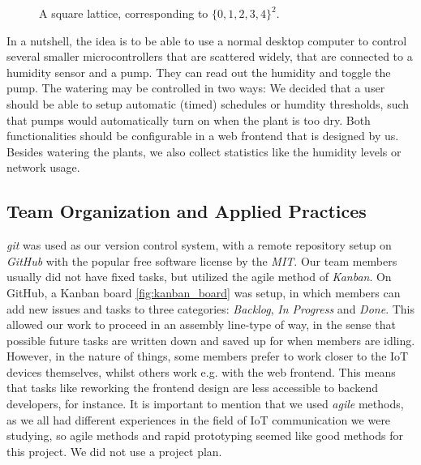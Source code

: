 \documentclass[acmtog, language=english, nonacm]{acmart}
\begin{document}
    \begin{figure}[!hbtp]
        \centering
        \small
        \caption{A square lattice, corresponding to \(\{0, 1, 2, 3, 4\}^2\).}
        \label{fig:lattice}
    \end{figure}

    In a nutshell, the idea is to be able to use a normal desktop computer to control several smaller microcontrollers that are scattered widely, that are connected to a humidity sensor and a pump. They can read out the humidity and toggle the pump. The watering may be controlled in two ways: We decided that a user should be able to setup automatic (timed) schedules or humdity thresholds, such that pumps would automatically turn on when the plant is too dry. Both functionalities should be configurable in a web frontend that is designed by us. Besides watering the plants, we also collect statistics like the humidity levels or network usage.

    \subsection{Team Organization and Applied Practices}

    \emph{git} was used as our version control system, with a remote repository setup on \emph{GitHub} with the popular free software license by the \emph{MIT}. Our team members usually did not have fixed tasks, but utilized the agile method of \emph{Kanban}. On GitHub, a Kanban board \cref{fig:kanban_board} was setup, in which members can add new issues and tasks to three categories: \emph{Backlog}, \emph{In Progress} and \emph{Done}. This allowed our work to proceed in an assembly line-type of way, in the sense that possible future tasks are written down and saved up for when members are idling. However, in the nature of things, some members prefer to work closer to the IoT devices themselves, whilst others work e.g. with the web frontend. This means that tasks like reworking the frontend design are less accessible to backend developers, for instance. It is important to mention that we used \emph{agile} methods, as we all had different experiences in the field of IoT communication we were studying, so agile methods and rapid prototyping seemed like good methods for this project. We did not use a project plan.
\end{document}
